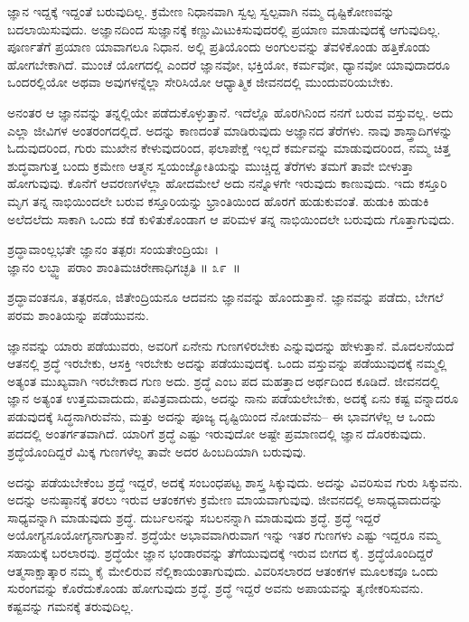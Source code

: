 ಜ್ಞಾನ ಇದ್ದಕ್ಕೆ ಇದ್ದಂತೆ ಬರುವುದಿಲ್ಲ. ಕ್ರಮೇಣ ನಿಧಾನವಾಗಿ ಸ್ವಲ್ಪ ಸ್ವಲ್ಪವಾಗಿ ನಮ್ಮ ದೃಷ್ಟಿಕೋಣವನ್ನು ಬದಲಾಯಿಸುವುದು. ಅಜ್ಞಾನದಿಂದ ಸುಜ್ಞಾನಕ್ಕೆ ಕಣ್ಣುಮಿಟುಕಿಸುವುದರಲ್ಲಿ ಪ್ರಯಾಣ ಮಾಡುವುದಕ್ಕೆ ಆಗುವುದಿಲ್ಲ. ಪೂರ್ಣತೆಗೆ ಪ್ರಯಾಣ ಯಾವಾಗಲೂ ನಿಧಾನ. ಅಲ್ಲಿ ಪ್ರತಿಯೊಂದು ಅಂಗುಲವನ್ನು ತೆವಳಿಕೊಂಡು ಹತ್ತಿಕೊಂಡು ಹೋಗಬೇಕಾಗಿದೆ. ಮುಂಚೆ ಯೋಗದಲ್ಲಿ ಎಂದರೆ ಜ್ಞಾನವೋ, ಭಕ್ತಿಯೋ, ಕರ್ಮವೋ, ಧ್ಯಾನವೋ ಯಾವುದಾದರೂ ಒಂದರಲ್ಲಿಯೋ ಅಥವಾ ಅವುಗಳನ್ನೆಲ್ಲಾ ಸೇರಿಸಿಯೋ ಆಧ್ಯಾತ್ಮಿಕ ಜೀವನದಲ್ಲಿ ಮುಂದುವರಿಯಬೇಕು.

ಅನಂತರ ಆ ಜ್ಞಾನವನ್ನು ತನ್ನಲ್ಲಿಯೇ ಪಡೆದುಕೊಳ್ಳುತ್ತಾನೆ. ಇದೆಲ್ಲೊ ಹೊರಗಿನಿಂದ ನನಗೆ ಬರುವ ವಸ್ತುವಲ್ಲ. ಅದು ಎಲ್ಲಾ ಜೀವಿಗಳ ಅಂತರಂಗದಲ್ಲಿದೆ. ಅದನ್ನು ಕಾಣದಂತೆ ಮಾಡಿರುವುದು ಅಜ್ಞಾನದ ತೆರೆಗಳು. ನಾವು ಶಾಸ್ತ್ರಾದಿಗಳನ್ನು ಓದುವುದರಿಂದ, ಗುರು ಮುಖೇನ ಕೇಳುವುದರಿಂದ, ಫಲಾಪೇಕ್ಷೆ ಇಲ್ಲದೆ ಕರ್ಮವನ್ನು ಮಾಡುವುದರಿಂದ, ನಮ್ಮ ಚಿತ್ತ ಶುದ್ಧವಾಗುತ್ತ ಬಂದು ಕ್ರಮೇಣ ಆತ್ಮನ ಸ್ವಯಂಜ್ಯೋತಿಯನ್ನು ಮುಚ್ಚಿದ್ದ ತೆರೆಗಳು ತಮಗೆ ತಾವೇ ಬೀಳುತ್ತಾ ಹೋಗುವುವು. ಕೊನೆಗೆ ಆವರಣಗಳೆಲ್ಲಾ ಹೋದಮೇಲೆ ಅದು ನನ್ನೊಳಗೇ ಇರುವುದು ಕಾಣುವುದು. ಇದು ಕಸ್ತೂರಿ ಮೃಗ ತನ್ನ ನಾಭಿಯಿಂದಲೇ ಬರುವ ಕಸ್ತೂರಿಯನ್ನು ಭ್ರಾಂತಿಯಿಂದ ಹೊರಗೆ ಹುಡುಕುವಂತೆ. ಹುಡುಕಿ ಹುಡುಕಿ ಅಲೆದಲೆದು ಸಾಕಾಗಿ ಒಂದು ಕಡೆ ಕುಳಿತುಕೊಂಡಾಗ ಆ ಪರಿಮಳ ತನ್ನ ನಾಭಿಯಿಂದಲೇ ಬರುವುದು ಗೊತ್ತಾಗುವುದು.

\begin{shloka}
ಶ್ರದ್ಧಾವಾಂಲ್ಲಭತೇ ಜ್ಞಾನಂ ತತ್ಪರಃ ಸಂಯತೇಂದ್ರಿಯಃ~।\\ಜ್ಞಾನಂ ಲಬ್ಧ್ವಾ ಪರಾಂ ಶಾಂತಿಮಚಿರೇಣಾಧಿಗಚ್ಛತಿ \hfill॥ ೩೯~॥
\end{shloka}

\begin{artha}
ಶ್ರದ್ಧಾವಂತನೂ, ತತ್ಪರನೂ, ಜಿತೇಂದ್ರಿಯನೂ ಆದವನು ಜ್ಞಾನವನ್ನು ಹೊಂದುತ್ತಾನೆ. ಜ್ಞಾನವನ್ನು ಪಡೆದು, ಬೇಗಲೆ ಪರಮ ಶಾಂತಿಯನ್ನು ಪಡೆಯುವನು.
\end{artha}

ಜ್ಞಾನವನ್ನು ಯಾರು ಪಡೆಯುವರು, ಅವರಿಗೆ ಏನೇನು ಗುಣಗಳಿರಬೇಕು ಎನ್ನುವುದನ್ನು ಹೇಳುತ್ತಾನೆ. ಮೊದಲನೆಯದೆ ಆತನಲ್ಲಿ ಶ್ರದ್ಧೆ ಇರಬೇಕು, ಆಸಕ್ತಿ ಇರಬೇಕು ಅದನ್ನು ಪಡೆಯುವುದಕ್ಕೆ. ಒಂದು ವಸ್ತುವನ್ನು ಪಡೆಯುವುದಕ್ಕೆ ನಮ್ಮಲ್ಲಿ ಅತ್ಯಂತ ಮುಖ್ಯವಾಗಿ ಇರಬೇಕಾದ ಗುಣ ಅದು. ಶ್ರದ್ಧೆ ಎಂಬ ಪದ ಮಹತ್ತಾದ ಅರ್ಥದಿಂದ ಕೂಡಿದೆ. ಜೀವನದಲ್ಲಿ ಜ್ಞಾನ ಅತ್ಯಂತ ಉತ್ತಮವಾದುದು, ಪವಿತ್ರವಾದುದು, ಅದನ್ನು ನಾನು ಪಡೆಯಲೇಬೇಕು, ಅದಕ್ಕೆ ಏನು ಕಷ್ಟ ವನ್ನಾದರೂ ಪಡುವುದಕ್ಕೆ ಸಿದ್ಧನಾಗಿರುವೆನು, ಮತ್ತು ಅದನ್ನು ಪೂಜ್ಯ ದೃಷ್ಟಿಯಿಂದ ನೋಡುವೆನು– ಈ ಭಾವಗಳೆಲ್ಲ ಆ ಒಂದು ಪದದಲ್ಲಿ ಅಂತರ್ಗತವಾಗಿದೆ. ಯಾರಿಗೆ ಶ್ರದ್ಧೆ ಎಷ್ಟು ಇರುವುದೋ ಅಷ್ಟೇ ಪ್ರಮಾಣದಲ್ಲಿ ಜ್ಞಾನ ದೊರಕುವುದು. ಶ್ರದ್ಧೆಯೊಂದಿದ್ದರೆ ಮಿಕ್ಕ ಗುಣಗಳೆಲ್ಲ ತಾವೇ ಅದರ ಹಿಂಬದಿಯಾಗಿ ಬರುವುವು.

ಅದನ್ನು ಪಡೆಯಬೇಕೆಂಬ ಶ್ರದ್ಧೆ ಇದ್ದರೆ, ಅದಕ್ಕೆ ಸಂಬಂಧಪಟ್ಟ ಶಾಸ್ತ್ರ ಸಿಕ್ಕುವುದು. ಅದನ್ನು ವಿವರಿಸುವ ಗುರು ಸಿಕ್ಕುವನು. ಅದನ್ನು ಅನುಷ್ಠಾನಕ್ಕೆ ತರಲು ಇರುವ ಆತಂಕಗಳು ಕ್ರಮೇಣ ಮಾಯವಾಗುವುವು. ಜೀವನದಲ್ಲಿ ಅಸಾಧ್ಯವಾದುದನ್ನು ಸಾಧ್ಯವನ್ನಾಗಿ ಮಾಡುವುದು ಶ್ರದ್ಧೆ. ದುರ್ಬಲನನ್ನು ಸಬಲನನ್ನಾಗಿ ಮಾಡುವುದು ಶ್ರದ್ಧೆ. ಶ್ರದ್ಧೆ ಇದ್ದರೆ ಅಯೋಗ್ಯನೂ\break ಯೋಗ್ಯನಾಗುತ್ತಾನೆ. ಶ್ರದ್ಧೆಯೇ ಅಭಾವವಾಗಿರುವಾಗ ಇನ್ನು ಇತರ ಗುಣಗಳು ಎಷ್ಟು ಇದ್ದರೂ ನಮ್ಮ ಸಹಾಯಕ್ಕೆ ಬರಲಾರವು. ಶ್ರದ್ಧೆಯೇ ಜ್ಞಾನ ಭಂಡಾರವನ್ನು ತೆಗೆಯುವುದಕ್ಕೆ ಇರುವ ಬೀಗದ ಕೈ. ಶ್ರದ್ಧೆಯೊಂದಿದ್ದರೆ ಆತ್ಮಸಾಕ್ಷಾತ್ಕಾರ ನಮ್ಮ ಕೈ ಮೇಲಿರುವ ನೆಲ್ಲಿಕಾಯಂತಾಗುವುದು. ವಿವರಿಸಲಾರದ ಆತಂಕಗಳ ಮೂಲಕವೂ ಒಂದು ಸುರಂಗವನ್ನು ಕೊರೆದುಕೊಂಡು ಹೋಗುವುದು ಶ್ರದ್ಧೆ. ಶ್ರದ್ಧೆ ಇದ್ದರೆ ಅವನು ಅಪಾಯವನ್ನು ತೃಣೀಕರಿಸುವನು. ಕಷ್ಟವನ್ನು ಗಮನಕ್ಕೆ ತರುವುದಿಲ್ಲ.

